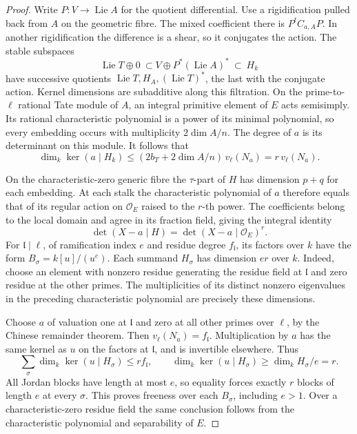\begin{proof}
Write \(P:V\to\operatorname{Lie}A\) for the quotient differential.
Use a rigidification pulled back from \(A\) on the geometric
fibre. The mixed coefficient there is \(P^t C_{a,A}P\).
In another rigidification the difference is a shear, so it
conjugates the action. The stable subspaces
\[
 \operatorname{Lie}T\oplus0\ \subset V\oplus P^*(\operatorname{Lie}A)^*\ \subset\ H_k
\]
have successive quotients \(\operatorname{Lie}T,H_A,
(\operatorname{Lie}T)^*\), the last with the conjugate action.
Kernel dimensions are subadditive along this filtration.
On the prime-to-\(\ell\) rational Tate module of \(A\), an
integral primitive element of \(E\) acts semisimply. Its rational
characteristic polynomial is a power of its minimal polynomial,
so every embedding occurs with multiplicity \(2\dim A/n\).
The degree of \(a\) is its determinant on this module.
\cite[Theorem~10.9 and Proposition~10.20]{milne-av-isogeny}
It follows that
\[
 \dim_k\ker(a\mid H_k)
   \le (2b_T+2\dim A/n)\,v_\ell(N_a)
   =r\,v_\ell(N_a).
\]

On the characteristic-zero generic fibre the \(\tau\)-part of
\(H\) has dimension \(p+q\) for each embedding. At each stalk
the characteristic polynomial of \(a\) therefore equals that
of its regular action on \(\mathcal O_E\) raised to the \(r\)-th
power. The coefficients belong to the local domain and agree in
its fraction field, giving the integral identity
\[
      \det(X-a\mid H)=\det(X-a\mid\mathcal O_E)^{r}.
\]
For \(\mathfrak l\mid\ell\), of ramification
index \(e\) and residue degree \(f_{\mathfrak l}\), its factors
over \(k\) have the form \(B_\sigma=k[u]/(u^e)\). Each summand
\(H_\sigma\) has dimension \(er\) over \(k\). Indeed, choose
an element with nonzero residue generating the residue field at
\(\mathfrak l\) and zero residue at the other primes. The
multiplicities of its distinct nonzero eigenvalues in the preceding
characteristic polynomial are precisely these dimensions.

Choose \(a\) of valuation one at \(\mathfrak l\) and zero
at all other primes over \(\ell\), by the Chinese remainder
theorem. Then \(v_\ell(N_a)=f_{\mathfrak l}\). Multiplication
by \(a\) has the same kernel as \(u\) on the factors at
\(\mathfrak l\), and is invertible elsewhere. Thus
\[
 \sum_{\sigma}\dim_k\ker(u\mid H_\sigma)\le r f_{\mathfrak l},
 \qquad \dim_k\ker(u\mid H_\sigma)\ge \dim_k H_\sigma/e=r .
\]
All Jordan blocks have length at most \(e\), so equality forces
exactly \(r\) blocks of length \(e\) at every \(\sigma\).
This proves freeness over each \(B_\sigma\), including \(e>1\).
Over a characteristic-zero residue field the same conclusion follows
from the characteristic polynomial and separability of \(E\).


\end{proof}
